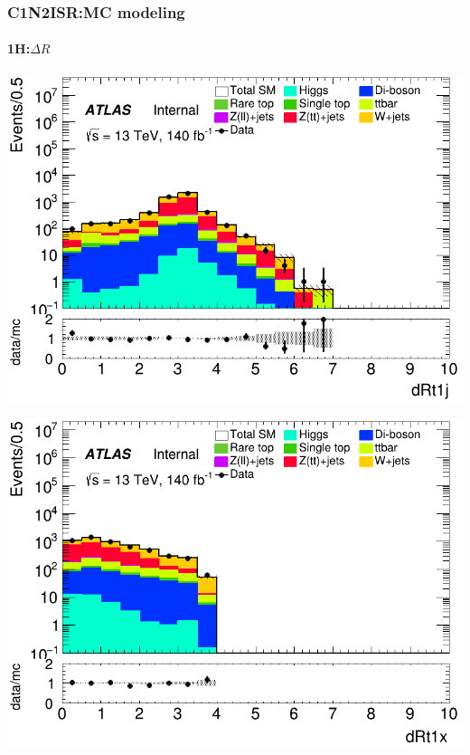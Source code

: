 \documentclass[usenames,dvipsnames]{beamer}
\begin{document}
\begin{frame}
\begin{minipage}{0.32\textwidth}
    \end{minipage}
\end{frame}

\begin{frame}
\frametitle{C1N2ISR:MC modeling}
\framesubtitle{1H:\quad $\Delta R$}
    \begin{minipage}{0.32\textwidth}
        \centering
        \includegraphics[width=\textwidth]{graphics/H_met/H_met_dRt1j.png}
    \end{minipage}
    \hfill
    \begin{minipage}{0.32\textwidth}
        \centering
        \includegraphics[width=\textwidth]{graphics/H_met/H_met_dRt1x.png}
    \end{minipage}
    \hfill
    \begin{minipage}{0.32\textwidth}

\end{minipage}
\end{frame}
\end{document}
